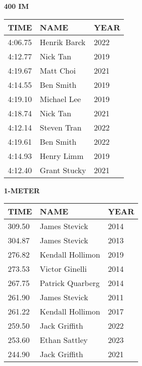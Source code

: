\begin{table}[H]
\centering
\begin{minipage}[t]{0.6\textwidth}
\centering
\textbf{400 IM}\\[0.1cm]
\begin{tabular}{@{}p{1.8cm}p{2.8cm}p{1.2cm}@{}}
\hline
    \textbf{TIME} & \textbf{NAME} & \textbf{YEAR} \\
\hline
    4:06.75 & Henrik Barck & 2022 \\
    4:12.77 & Nick Tan & 2019 \\
    4:19.67 & Matt Choi & 2021 \\
    4:14.55 & Ben Smith & 2019 \\
    4:19.10 & Michael Lee & 2019 \\
    4:18.74 & Nick Tan & 2021 \\
    4:12.14 & Steven Tran & 2022 \\
    4:19.61 & Ben Smith & 2022 \\
    4:14.93 & Henry Limm & 2019 \\
    4:12.40 & Grant Stucky & 2021 \\
\hline
\end{tabular}
\end{minipage}
\end{table}

\begin{table}[H]
\centering
\begin{minipage}[t]{0.6\textwidth}
\centering
\textbf{1-METER}\\[0.1cm]
\begin{tabular}{@{}p{1.8cm}p{2.8cm}p{1.2cm}@{}}
\hline
    \textbf{TIME} & \textbf{NAME} & \textbf{YEAR} \\
\hline
    309.50 & James Stevick & 2014 \\
    304.87 & James Stevick & 2013 \\
    276.82 & Kendall Hollimon & 2019 \\
    273.53 & Victor Ginelli & 2014 \\
    267.75 & Patrick Quarberg & 2014 \\
    261.90 & James Stevick & 2011 \\
    261.22 & Kendall Hollimon & 2017 \\
    259.50 & Jack Griffith & 2022 \\
    253.60 & Ethan Sattley & 2023 \\
    244.90 & Jack Griffith & 2021 \\
\hline
\end{tabular}
\end{minipage}
\end{table}

